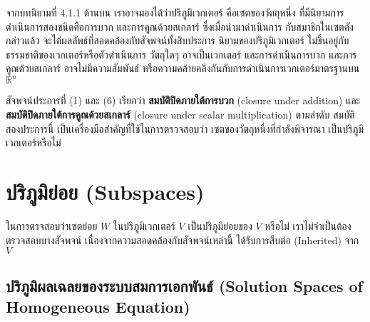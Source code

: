 \documentclass[../main.tex]{subfiles}
\begin{document}
    จากบทนิยามที่ 4.1.1 ด้านบน เราอาจมองได้ว่าปริภูมิเวกเตอร์ 
    คือเซตของวัตถุหนึ่ง ที่มีนิยามการดำเนินการสองชนิดคือการบวก 
    และการคูณด้วยสเกลาร์ ซึ่งเมื่อนำมาดำเนินการ กับสมาชิกในเซตดังกล่าวแล้ว 
    จะได้ผลลัพธ์ที่สอดคล้องกับสัจพจน์ทั้งสิบประการ นิยามของปริภูมิเวกเตอร์
    ไม่ขึ้นอยู่กับธรรมชาติของเวกเตอร์หรือตัวดำเนินการ วัตถุใดๆ อาจเป็นเวกเตอร์
    และการดำเนินการบวก และการคูณด้วยสเกลาร์ อาจไม่มีความสัมพันธ์ 
    หรือความคล้ายคลึงกันกับการดำเนินการเวกเตอร์มาตรฐานบน $\mathbb R^n$

    สัจพจน์ประการที่ (1) และ (6) เรียกว่า 
    \textbf{สมบัติปิดภายใต้การบวก}
    (closure under addition) และ 
    \textbf{สมบัติปิดภายใต้การคูณด้วยสเกลาร์} 
    (closure under scalar multiplication) ตามลำดับ 
    สมบัติสองประการนี้ เป็นเครื่องมือสำคัญที่ใช้ในการตรวจสอบว่า
    เซตของวัตถุหนึ่งที่กำลังพิจารณา เป็นปริภูมิเวกเตอร์หรือไม่ 
  
\section{ปริภูมิย่อย (Subspaces)}
    ในการตรจสอบว่าเซตย่อย $W$ ในปริภูมิเวกเตอร์ $V$ 
    เป็นปริภูมิย่อยของ $V$ หรือไม่ เราไม่จำเป็นต้องตรวจสอบบางสัจพจน์
    เนื่องจากความสอดคล้องกับสัจพจน์เหล่านี้ ได้รับการสืบต่อ 
    (Inherited) จาก $V$ 

    \subsection{
        ปริภูมิผลเฉลยของระบบสมการเอกพันธ์ 
        (Solution Spaces of Homogeneous Equation)
        } 
\end{document}
